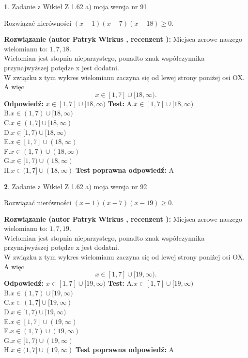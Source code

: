 \documentclass[12pt, a4paper]{article}
\theoremstyle{definition} %
\newtheorem{zad}{}
\newcommand{\zadStart}[1]{\begin{zad}#1\newline}
\newcommand{\zadStop}{\end{zad}}
\newcommand{\rozwStart}[2]{\noindent \textbf{Rozwiązanie (autor #1 , recenzent #2): }\newline}
\newcommand{\rozwStop}{\newline}
\newcommand{\odpStart}{\noindent \textbf{Odpowiedź:}\newline}
\newcommand{\odpStop}{\newline}
\newcommand{\testStart}{\noindent \textbf{Test:}\newline}
\newcommand{\testStop}{\newline}
\newcommand{\kluczStart}{\noindent \textbf{Test poprawna odpowiedź:}\newline}
\newcommand{\kluczStop}{\newline}
\begin{document}
\zadStart{Zadanie z Wikieł Z 1.62 a) moja wersja nr 91}

Rozwiązać nierówności $(x-1)(x-7)(x-18)\ge0$.
\zadStop
\rozwStart{Patryk Wirkus}{}
Miejsca zerowe naszego wielomianu to: $1, 7, 18$.\\
Wielomian jest stopnia nieparzystego, ponadto znak współczynnika przy\linebreak najwyższej potędze x jest dodatni.\\ W związku z tym wykres wielomianu zaczyna się od lewej strony poniżej osi OX. A więc $$x \in [1,7] \cup [18,\infty).$$
\rozwStop
\odpStart
$x \in [1,7] \cup [18,\infty)$
\odpStop
\testStart
A.$x \in [1,7] \cup [18,\infty)$\\
B.$x \in (1,7) \cup [18,\infty)$\\
C.$x \in (1,7] \cup [18,\infty)$\\
D.$x \in [1,7) \cup [18,\infty)$\\
E.$x \in [1,7] \cup (18,\infty)$\\
F.$x \in (1,7) \cup (18,\infty)$\\
G.$x \in [1,7) \cup (18,\infty)$\\
H.$x \in (1,7] \cup (18,\infty)$
\testStop
\kluczStart
A
\kluczStop



\zadStart{Zadanie z Wikieł Z 1.62 a) moja wersja nr 92}

Rozwiązać nierówności $(x-1)(x-7)(x-19)\ge0$.
\zadStop
\rozwStart{Patryk Wirkus}{}
Miejsca zerowe naszego wielomianu to: $1, 7, 19$.\\
Wielomian jest stopnia nieparzystego, ponadto znak współczynnika przy\linebreak najwyższej potędze x jest dodatni.\\ W związku z tym wykres wielomianu zaczyna się od lewej strony poniżej osi OX. A więc $$x \in [1,7] \cup [19,\infty).$$
\rozwStop
\odpStart
$x \in [1,7] \cup [19,\infty)$
\odpStop
\testStart
A.$x \in [1,7] \cup [19,\infty)$\\
B.$x \in (1,7) \cup [19,\infty)$\\
C.$x \in (1,7] \cup [19,\infty)$\\
D.$x \in [1,7) \cup [19,\infty)$\\
E.$x \in [1,7] \cup (19,\infty)$\\
F.$x \in (1,7) \cup (19,\infty)$\\
G.$x \in [1,7) \cup (19,\infty)$\\
H.$x \in (1,7] \cup (19,\infty)$
\testStop
\kluczStart
A
\kluczStop
\end{document}
